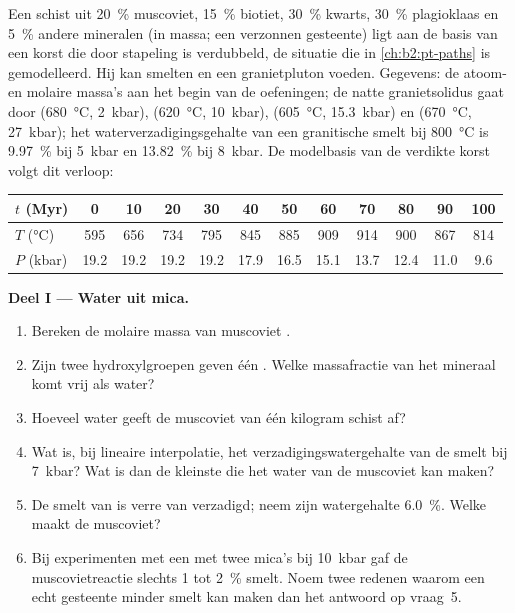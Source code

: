 \begin{problem}\label{pb:b2:crustal-melting:1}
Een schist uit \qty{20}{\percent} muscoviet, \qty{15}{\percent} biotiet,
\qty{30}{\percent} kwarts, \qty{30}{\percent} plagioklaas en \qty{5}{\percent} andere
mineralen (in massa; een verzonnen gesteente) ligt aan de basis van een korst die door stapeling is verdubbeld, de
situatie die in \cref{ch:b2:pt-paths} is gemodelleerd. Hij kan smelten en een granietpluton voeden. Gegevens:
de atoom- en molaire massa's aan het begin van de oefeningen; de natte granietsolidus gaat
door (\qty{680}{\celsius}, \qty{2}{kbar}), (\qty{620}{\celsius}, \qty{10}{kbar}),
(\qty{605}{\celsius}, \qty{15.3}{kbar}) en (\qty{670}{\celsius}, \qty{27}{kbar}); het
waterverzadigingsgehalte van een granitische smelt bij \qty{800}{\celsius} is \qty{9.97}{\percent} bij
\qty{5}{kbar} en \qty{13.82}{\percent} bij \qty{8}{kbar}. De modelbasis van de verdikte korst volgt dit verloop:

\smallskip
\begin{center}\small
\begin{tabular}{l|ccccccccccc}
$t$ (\unit{Myr}) & 0 & 10 & 20 & 30 & 40 & 50 & 60 & 70 & 80 & 90 & 100\\ \hline
$T$ (\unit{\celsius}) & 595 & 656 & 734 & 795 & 845 & 885 & 909 & 914 & 900 & 867 & 814\\
$P$ (\unit{kbar}) & 19.2 & 19.2 & 19.2 & 19.2 & 17.9 & 16.5 & 15.1 & 13.7 & 12.4 & 11.0 & 9.6
\end{tabular}
\end{center}
\smallskip

\noindent\textbf{Deel I --- Water uit mica.}
\begin{enumerate}
\item Bereken de molaire massa van muscoviet .
\item Zijn twee hydroxylgroepen geven één . Welke massafractie van het mineraal
komt vrij als water?
\item Hoeveel water geeft de muscoviet van één kilogram schist af?
\item Wat is, bij lineaire interpolatie, het verzadigingswatergehalte van de smelt bij
\qty{7}{kbar}? Wat is dan de kleinste  die het water van de muscoviet kan maken?
\item De smelt van  is verre van verzadigd; neem zijn watergehalte
\qty{6.0}{\percent}. Welke  maakt de muscoviet?
\item Bij experimenten met een  met twee mica's bij \qty{10}{kbar} gaf de muscovietreactie
slechts 1 tot \qty{2}{\percent} smelt. Noem twee redenen waarom een echt gesteente minder
smelt kan maken dan het antwoord op vraag~5.
\end{enumerate}


\end{problem}
